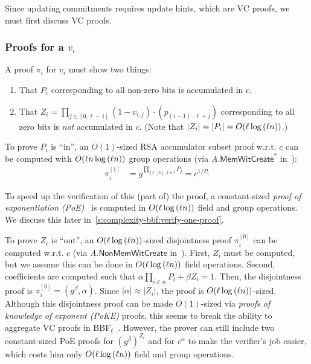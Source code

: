 Since updating commitments requires update hints, which are VC proofs, we must first discuss VC proofs.

\subsubsection{Proofs for a $v_i$}
\label{s:complexity-bbf:compute-one-proof}
A proof $\pi_i$ for $v_i$ must show two things:
\begin{enumerate}
\item That $P_i$ corresponding to all non-zero bits is accumulated in $c$.
\item That $Z_i= \prod_{j\in[0,\ell-1]} {(1-v_{i,j})}\cdot \left(p_{(i-1)\cdot \ell + j}\right)$ corresponding to all zero bits is \textit{not} accumulated in $c$.
(Note that $|Z_i|=|P_i|=O(\ell\log{(\ell n)})$.)
\end{enumerate}

To prove $P_i$ is ``in'', an $O(1)$-sized RSA accumulator subset proof w.r.t. $c$ can be computed with $O(\ell n \log{(\ell n)})$ group operations (via \textit{A}.$\mathsf{MemWitCreate}^*$ in~\cite[Sec 4.2, pg. 15]{BBF18}):
\begin{align}
\label{eq:bbf:pi_i1}
\pi_i^{[1]} &=g^{\prod_{j\in [n],j \ne i} P_j} = c^{1/P_i}
\end{align}

To speed up the verification of this (part of) the proof, a constant-sized \textit{proof of exponentiation (PoE)}~\cite{BBF18} is computed in $O(\ell\log{(\ell n)})$ field and group operations.
We discuss this later in~\cref{s:complexity-bbf:verify-one-proof}.

To prove $Z_i$ is ``out'', an $O(\ell \log{(\ell n)})$-sized disjointness proof $\pi_i^{[0]}$ can be computed w.r.t. $c$ (via \textit{A}.$\mathsf{NonMemWitCreate}$ in~\cite[Sec 4.1, pg. 14]{BBF18}).
First, $Z_i$ must be computed, but we assume this can be done in $O(\ell\log{(\ell n)})$ field operations.
Second, \bezout coefficients are computed such that $\alpha \prod_{i\in n} P_i + \beta Z_i =1$.
Then, the disjointness proof is $\pi_i^{[0]}=(g^{\beta},\alpha)$.
Since $|\alpha| \approx |Z_i|$, the proof is $O(\ell \log{(\ell n)})$-sized.
Although this disjointness proof can be made $O(1)$-sized via \textit{proofs of knowledge of exponent (PoKE)} proofs, this seems to break the ability to aggregate VC proofs in BBF$_\ell$~\cite[Sec 5.2, pg. 20]{BBF18}.
However, the prover can still include two constant-sized  PoE proofs for $(g^{\beta})^{Z_i}$ and for $c^{\alpha}$ to make the verifier's job easier, which costs him only $O(\ell \log{(\ell n)})$ field and group operations.

